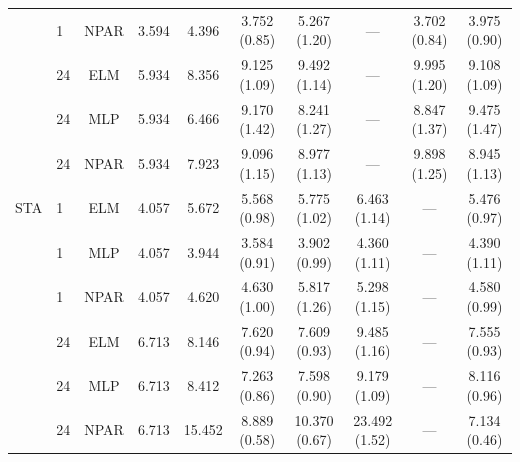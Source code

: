 \begin{table}[H]
{\begin{tabular}{llcccccccc}
 & 1 & NPAR & 3.594 & 4.396 & 3.752 (0.85) & 5.267 (1.20) & --- & 3.702 (0.84) & 3.975 (0.90) \\
 & 24 & ELM & 5.934 & 8.356 & 9.125 (1.09) & 9.492 (1.14) & --- & 9.995 (1.20) & 9.108 (1.09) \\
 & 24 & MLP & 5.934 & 6.466 & 9.170 (1.42) & 8.241 (1.27) & --- & 8.847 (1.37) & 9.475 (1.47) \\
 & 24 & NPAR & 5.934 & 7.923 & 9.096 (1.15) & 8.977 (1.13) & --- & 9.898 (1.25) & 8.945 (1.13) \\
\midrule
STA & 1 & ELM & 4.057 & 5.672 & 5.568 (0.98) & 5.775 (1.02) & 6.463 (1.14) & --- & 5.476 (0.97) \\
 & 1 & MLP & 4.057 & 3.944 & 3.584 (0.91) & 3.902 (0.99) & 4.360 (1.11) & --- & 4.390 (1.11) \\
 & 1 & NPAR & 4.057 & 4.620 & 4.630 (1.00) & 5.817 (1.26) & 5.298 (1.15) & --- & 4.580 (0.99) \\
 & 24 & ELM & 6.713 & 8.146 & 7.620 (0.94) & 7.609 (0.93) & 9.485 (1.16) & --- & 7.555 (0.93) \\
 & 24 & MLP & 6.713 & 8.412 & 7.263 (0.86) & 7.598 (0.90) & 9.179 (1.09) & --- & 8.116 (0.96) \\
 & 24 & NPAR & 6.713 & 15.452 & 8.889 (0.58) & 10.370 (0.67) & 23.492 (1.52) & --- & 7.134 (0.46) \\
\bottomrule
\end{tabular}}
\end{table}
